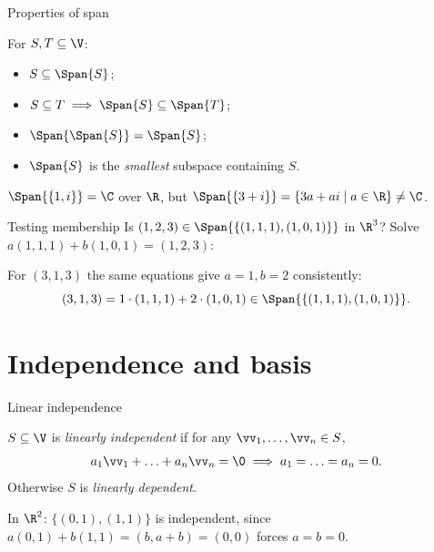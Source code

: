 \begin{frame}{Properties of span}
\begin{fact}
For $S,T\subseteq\V$:
\begin{itemize}
\item $S\subseteq\Span{S}$;
\pause
\item $S\subseteq T \implies \Span{S}\subseteq\Span{T}$;
\pause
\item $\Span{\Span{S}} = \Span{S}$;
\pause
\item $\Span{S}$ is the \emph{smallest} subspace containing $S$.
\end{itemize}
\end{fact}

\pause

\begin{example}
$\Span{\{1,i\}}=\C$ over $\R$, but $\Span{\{3+i\}} = \{3a+ai\mid a\in\R\}\neq\C$.
\end{example}
\end{frame}

\begin{frame}{Testing membership}
Is $(1,2,3)\in\Span{\{(1,1,1),(1,0,1)\}}$ in $\R^3$? Solve $a(1,1,1)+b(1,0,1)=(1,2,3)$:

\pause

\begin{steps}
\end{steps}

\pause

For $(3,1,3)$ the same equations give $a=1,b=2$ consistently:
\[
(3,1,3) = 1\cdot(1,1,1)+2\cdot(1,0,1)\in\Span{\{(1,1,1),(1,0,1)\}}.
\]
\end{frame}

\section{Independence and basis}

\begin{frame}{Linear independence}
\begin{definition}
$S\subseteq\V$ is \emph{linearly independent} if for any $\vv_1,\ldots,\vv_n\in S$,
\[
a_1\vv_1+\ldots+a_n\vv_n=\0 \implies a_1=\ldots=a_n=0.
\]
Otherwise $S$ is \emph{linearly dependent}.
\end{definition}

\pause

\begin{example}
In $\R^2$: $\{(0,1),(1,1)\}$ is independent, since $a(0,1)+b(1,1)=(b,a+b)=(0,0)$ forces $a=b=0$.
\end{example}
\end{frame}

